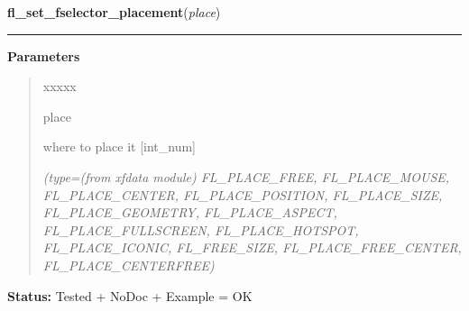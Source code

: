 \hspace{.8\funcindent}\begin{boxedminipage}{\funcwidth}

    \raggedright \textbf{fl\_set\_fselector\_placement}(\textit{place})

    \vspace{-1.5ex}

    \rule{\textwidth}{0.5\fboxrule}
\setlength{\parskip}{2ex}
\setlength{\parskip}{1ex}
      \textbf{Parameters}
      \vspace{-1ex}

      \begin{quote}
        \begin{Ventry}{xxxxx}

          \item[place]

          where to place it [int\_num]

            {\it (type=(from xfdata module) FL\_PLACE\_FREE, FL\_PLACE\_MOUSE, FL\_PLACE\_CENTER, 
FL\_PLACE\_POSITION, FL\_PLACE\_SIZE, FL\_PLACE\_GEOMETRY, 
FL\_PLACE\_ASPECT, FL\_PLACE\_FULLSCREEN, FL\_PLACE\_HOTSPOT, 
FL\_PLACE\_ICONIC, FL\_FREE\_SIZE, FL\_PLACE\_FREE\_CENTER, 
FL\_PLACE\_CENTERFREE)}

        \end{Ventry}

      \end{quote}

\textbf{Status:} Tested + NoDoc + Example = OK



    \end{boxedminipage}

    \label{xformslib:library:fl_set_fselector_border}

    \vspace{0.5ex}

